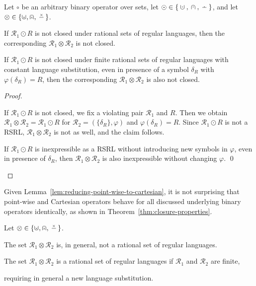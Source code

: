 \documentclass[envcountsame]{llncs}
\newcommand{\rationalset}{\ensuremath{\mathcal{R}}\xspace}
\newcommand{\dotdiv}{\:\ensuremath{\mathaccent\cdot-}\:}
\newcommand{\dotcup}{\:\ensuremath{\mathaccent\cdot\cup}\:}
\newcommand{\dotcap}{\:\ensuremath{\mathaccent\cdot\cap}\:}
\newcommand{\timescup}{\mathrel{\ooalign{\hss$\scriptscriptstyle\mathaccent\times{ }$\hss\cr$\cup$}}}
\newcommand{\timescap}{\mathrel{\ooalign{\hss$\scriptscriptstyle\mathaccent\times{ }$\hss\cr$\cap$}}}
\newcommand{\timesminus}{\:\ensuremath{\scriptscriptstyle\mathaccent\times{\textstyle-}}\:}
\newcommand{\RegularlyGeneratedLanguageSets}{rational sets of regular languages\xspace}
\newcommand{\RegularlyGeneratedLanguageSet}{rational set of regular languages\xspace}
\newcommand{\RegularlyGeneratedLanguageSetAbbrev}{RSRL\xspace}
\begin{document}
\begin{lemma}
  \label{lem:reducing-point-wise-to-cartesian}
  Let $\circ$ be an arbitrary binary operator over sets, let $\odot \in \{ \dotcup, \dotcap, \dotdiv \}$, and let $\otimes \in \{ \timescup, \timescap, {\timesminus} \}$.
  \begin{inparaenum}
  \item If $\rationalset_1\odot R$ is not closed under \RegularlyGeneratedLanguageSets,
    then the corresponding $\rationalset_1\otimes \rationalset_2$ is not closed.
  \item If $\rationalset_1\odot R$ is not closed under finite 
  	\RegularlyGeneratedLanguageSets with constant language 
  	substitution, even in presence of a
    symbol $\delta_R$ with $\varphi(\delta_R)=R$, then the corresponding
    $\rationalset_1\otimes\rationalset_2$ is also not closed.
  \end{inparaenum}
\end{lemma}

\begin{proof}
  \begin{inparaenum}[\bfseries(1)]
  \item If $\rationalset_1\odot R$ is not closed, we fix a violating
    pair $\rationalset_1$ and $R$.
Then we obtain
    $\rationalset_1\otimes\rationalset_2=\rationalset_1\odot R$  for
    $\rationalset_2=(\{\delta_R\},\varphi)$ and $\varphi(\delta_R)=R$.
Since $\rationalset_1\odot R$ is not a \RegularlyGeneratedLanguageSetAbbrev,
    $\rationalset_1\otimes\rationalset_2$ is not as well, and the
    claim follows.
\item If $\rationalset_1\odot R$ is inexpressible as a \RegularlyGeneratedLanguageSetAbbrev
    without introducing new symbols in $\varphi$, even in presence of
    $\delta_R$, then $\rationalset_1\otimes\rationalset_2$ is also
    inexpressible without changing $\varphi$.  
\qed
  \end{inparaenum}
\end{proof}


Given Lemma~\ref{lem:reducing-point-wise-to-cartesian}, it is not
surprising that point-wise and Cartesian operators behave for all
discussed underlying binary operators identically, as shown in Theorem~\ref{thm:closure-properties}.


\begin{corollary}
  \label{cor:catesian-binary}
  Let $\otimes \in \{ \timescup, \timescap, {\timesminus} \}$.
  \begin{inparaenum}
  \item The set $\rationalset_1 \otimes \rationalset_2$ is, in
    general, not a \RegularlyGeneratedLanguageSet.
  \item The set $\rationalset_1 \otimes \rationalset_2$ is a
    \RegularlyGeneratedLanguageSet if $\rationalset_1$ and $\rationalset_2$ are finite,
  \item requiring in general a new language substitution.
  \end{inparaenum}
\end{corollary}
\end{document}
